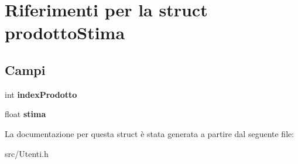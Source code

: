 \hypertarget{structprodotto_stima}{}\section{Riferimenti per la struct prodotto\+Stima}
\label{structprodotto_stima}
\subsection*{Campi}
\begin{DoxyCompactItemize}
\item 
\mbox{\label{structprodotto_stima_af1a1953ea974832f2f8f4f5bbe5d85ba}} 
int {\bfseries index\+Prodotto}
\item 
\mbox{\label{structprodotto_stima_afe306979aae2e11dfe72752e67f8713c}} 
float {\bfseries stima}
\end{DoxyCompactItemize}


La documentazione per questa struct è stata generata a partire dal seguente file\+:\begin{DoxyCompactItemize}
\item 
src/Utenti.\+h\end{DoxyCompactItemize}
